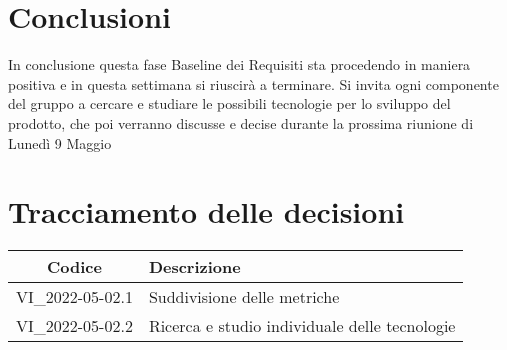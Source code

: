 \section{Conclusioni}
In conclusione questa fase Baseline dei Requisiti sta procedendo in maniera positiva e in questa 
settimana si riuscirà a terminare. Si invita ogni componente del gruppo a cercare e studiare 
le possibili tecnologie per lo sviluppo del prodotto, che poi verranno discusse e decise 
durante la prossima riunione di Lunedì 9 Maggio
\newpage

\section*{Tracciamento delle decisioni}
	\renewcommand{\arraystretch}{1.8} %
	\begin{tabular}{ |c|l| }
		\hline
		\textbf{Codice} & \textbf{Descrizione} \\
		\hline
		VI\_2022-05-02.1 & Suddivisione delle metriche\\
		\hline
		VI\_2022-05-02.2 & Ricerca e studio individuale delle tecnologie\\
		\hline
	\end{tabular}